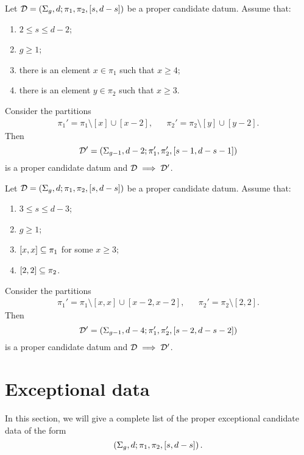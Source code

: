 \documentclass{article}
\begin{document}
\begin{combinatorialmove}\label{move:4-3}
Let $\mathcal{D}=\left(\Sigma_g,d;\pi_1,\pi_2,[s,d-s]\right)$ be a proper candidate datum. Assume that:
\begin{enumerate}
\item $2\le s\le d-2$;
\item $g\ge 1$;
\item there is an element $x\in\pi_1$ such that $x\ge 4$;
\item there is an element $y\in\pi_2$ such that $x\ge 3$.
\end{enumerate}
Consider the partitions
\begin{align*}
\pi_1'=\pi_1\setminus[x]\cup[x-2],&&\pi_2'=\pi_2\setminus[y]\cup[y-2].
\end{align*}
Then
\[
\mathcal{D'}=\left(\Sigma_{g-1},d-2;\pi_1',\pi_2',[s-1,d-s-1]\right)
\]
is a proper candidate datum and $\mathcal{D}\implies\mathcal{D}'$.
\end{combinatorialmove}

\begin{combinatorialmove}\label{move:33-22}
Let $\mathcal{D}=\left(\Sigma_g,d;\pi_1,\pi_2,[s,d-s]\right)$ be a proper candidate datum. Assume that:
\begin{enumerate}
\item $3\le s\le d-3$;
\item $g\ge 1$;
\item $[x,x]\subseteq\pi_1$ for some $x\ge 3$;
\item $[2,2]\subseteq\pi_2$.
\end{enumerate}
Consider the partitions
\begin{align*}
\pi_1'=\pi_1\setminus[x,x]\cup[x-2,x-2],&&\pi_2'=\pi_2\setminus[2,2].
\end{align*}
Then
\[
\mathcal{D}'=\left(\Sigma_{g-1},d-4;\pi_1',\pi_2',[s-2,d-s-2]\right)
\]
is a proper candidate datum and $\mathcal{D}\implies\mathcal{D}'$.
\end{combinatorialmove}

\section{Exceptional data}
In this section, we will give a complete list of the proper exceptional candidate data of the form
\[
\left(\Sigma_g,d;\pi_1,\pi_2,[s,d-s]\right).
\]
\end{document}
